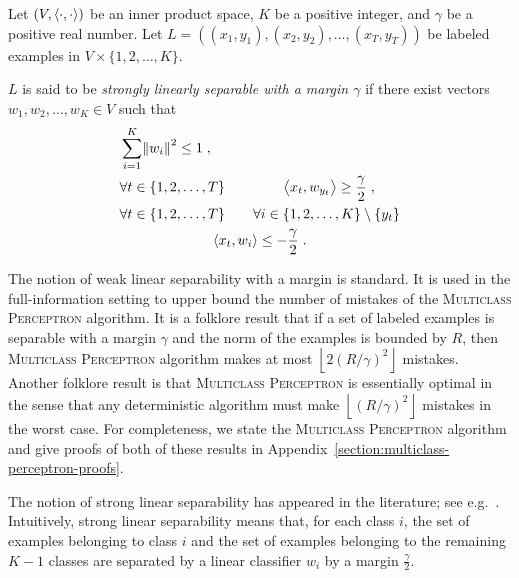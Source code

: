 \begin{definition}
\label{definition:strong-linear-separability}
Let $(V,\left\langle \cdot, \cdot \right\rangle)$ be an inner product space, $K$ be a positive
integer, and $\gamma$ be a positive real number. Let $L = ((x_1, y_1), (x_2,
y_2), \dots, (x_T, y_T))$ be labeled examples in $V \times \{1,2,\dots,K\}$.

$L$ is said to be \emph{strongly linearly separable with a
margin $\gamma$} if there exist vectors $w_1, w_2, \dots, w_K \in V$ such
that
\begin{align}
\label{equation:strong-linear-separability-1}
& \sum_{i=1}^K \norm{w_i}^2 \le 1 \; , \\
\label{equation:strong-linear-separability-2}
& \forall t \in \{1,2,\dots,T\} \qquad \qquad \left\langle x_t, w_{y_t} \right\rangle \ge \frac \gamma 2 \; , \\
\label{equation:strong-linear-separability-3}
& \begin{gathered}
\forall t \in \{1,2,\dots,T\} \qquad \forall i \in \{1,2,\dots, K\} \setminus \{y_t\} \\
\left\langle x_t, w_i \right\rangle \le - \frac \gamma 2 \; .
\end{gathered}
\end{align}
\end{definition}

The notion of weak linear separability with a margin is standard. It is used in
the full-information setting to upper bound the number of mistakes of the
\textsc{Multiclass Perceptron} algorithm. It is a folklore result that if a set
of labeled examples is separable with a margin $\gamma$ and the norm of the
examples is bounded by $R$, then \textsc{Multiclass Perceptron} algorithm makes
at most $\left\lfloor 2(R/\gamma)^2 \right \rfloor$ mistakes. Another folklore
result is that \textsc{Multiclass Perceptron} is essentially optimal in the
sense that any deterministic algorithm must make $\left\lfloor (R/\gamma)^2
\right \rfloor$ mistakes in the worst case.
For completeness, we state the
\textsc{Multiclass Perceptron} algorithm and give proofs of both of these
results in Appendix~\ref{section:multiclass-perceptron-proofs}.


The notion of strong linear separability has appeared in the literature; see
e.g.~\citet{Chen-Chen-Zhang-Chen-Zhang-2009}.
Intuitively, strong linear
separability means that, for each class $i$, the set of examples belonging to
class $i$ and the set of examples belonging to the remaining $K-1$ classes are
separated by a linear classifier $w_i$ by a margin $\frac \gamma 2$.

